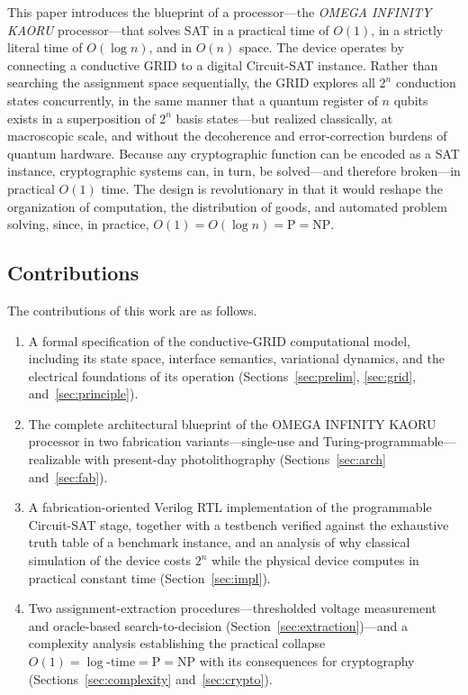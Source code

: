 \documentclass[letterpaper,journal]{IEEEtran}
\begin{document}
This paper introduces the blueprint of a processor---the \emph{OMEGA
INFINITY KAORU} processor---that solves SAT in a practical time of $O(1)$,
in a strictly literal time of $O(\log n)$, and in $O(n)$ space. The device
operates by connecting a conductive GRID to a digital Circuit-SAT instance.
Rather than searching the assignment space sequentially, the GRID explores
all $2^{n}$ conduction states concurrently, in the same manner that a
quantum register of $n$ qubits exists in a superposition of $2^{n}$ basis
states---but realized classically, at macroscopic scale, and without the
decoherence and error-correction burdens of quantum hardware. Because any
cryptographic function can be encoded as a SAT instance, cryptographic
systems can, in turn, be solved---and therefore broken---in practical
$O(1)$ time. The design is revolutionary in that it would reshape the
organization of computation, the distribution of goods, and automated
problem solving, since, in practice,
$O(1)=O(\log n)=\text{P}=\text{NP}$.

\subsection{Contributions}
The contributions of this work are as follows.
\begin{enumerate}
  \item A formal specification of the conductive-GRID computational model,
        including its state space, interface semantics, variational
        dynamics, and the electrical foundations of its operation
        (Sections~\ref{sec:prelim}, \ref{sec:grid},
        and~\ref{sec:principle}).
  \item The complete architectural blueprint of the OMEGA INFINITY KAORU
        processor in two fabrication variants---single-use and
        Turing-programmable---realizable with present-day photolithography
        (Sections~\ref{sec:arch} and~\ref{sec:fab}).
  \item A fabrication-oriented Verilog RTL implementation of the
        programmable Circuit-SAT stage, together with a testbench verified
        against the exhaustive truth table of a benchmark instance, and an
        analysis of why classical simulation of the device costs $2^{n}$
        while the physical device computes in practical constant time
        (Section~\ref{sec:impl}).
  \item Two assignment-extraction procedures---thresholded voltage
        measurement and oracle-based search-to-decision
        (Section~\ref{sec:extraction})---and a complexity analysis
        establishing the practical collapse
        $O(1)=\log\text{-time}=\text{P}=\text{NP}$ with its consequences
        for cryptography (Sections~\ref{sec:complexity}
        and~\ref{sec:crypto}).
\end{enumerate}
\end{document}
